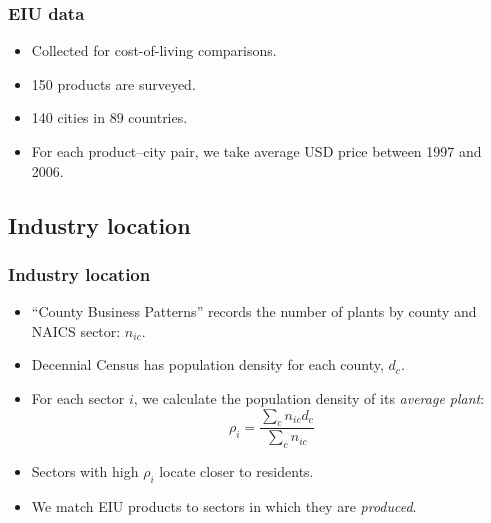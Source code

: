 \documentclass[compress,mathserif]{beamer}
\newcounter{perc}
\newcounter{percek}
\renewcommand{\time}[1]{\addtocounter{percek}{#1}}
\begin{document}
\begin{frame}\frametitle{EIU data}
\begin{itemize}
\item Collected for cost-of-living comparisons.
\item 150 products are surveyed.
\item 140 cities in 89 countries.
\item For each product--city pair, we take average USD price between 1997 and 2006.
\end{itemize}
\end{frame}
\time 4

\subsection{Industry location}
\begin{frame}\frametitle{Industry location}
\begin{itemize}
\item ``County Business Patterns'' records the number of plants by county and NAICS sector: $n_{ic}$.
\item Decennial Census has population density for each county, $d_c$.
\item For each sector $i$, we calculate the population density of its \emph{average plant}:
\[
\rho_i = \frac{\sum_c n_{ic} d_c}{\sum_c n_{ic} }
\]
\item Sectors with high $\rho_i$ locate closer to residents.
\item We match EIU products to sectors in which they are \emph{produced}.
\end{itemize}
\end{frame}
\end{document}
